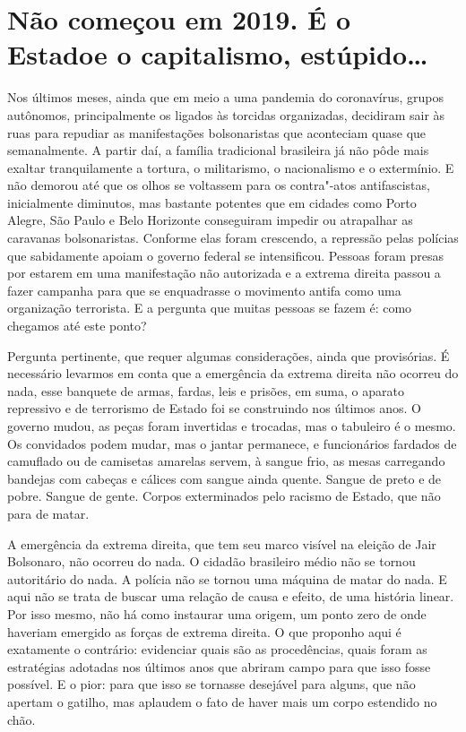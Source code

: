 \section{Não começou em 2019. É o Estado\break e o capitalismo, estúpido\ldots{}}

Nos últimos meses, ainda que em meio a uma pandemia do coronavírus,
grupos autônomos, principalmente os ligados às torcidas organizadas,
decidiram sair às ruas para repudiar as manifestações bolsonaristas que
aconteciam quase que semanalmente. A partir daí, a família tradicional
brasileira já não pôde mais exaltar tranquilamente a tortura, o
militarismo, o nacionalismo e o extermínio. E não demorou até que os
olhos se voltassem para os contra"-atos antifascistas, inicialmente
diminutos, mas bastante potentes que em cidades como Porto Alegre, São
Paulo e Belo Horizonte conseguiram impedir ou atrapalhar as caravanas
bolsonaristas. Conforme elas foram crescendo, a repressão pelas polícias
que sabidamente apoiam o governo federal se intensificou. Pessoas foram
presas por estarem em uma manifestação não autorizada e a
extrema direita passou a fazer campanha para que se enquadrasse o
movimento antifa como uma organização terrorista. E a pergunta
que muitas pessoas se fazem é: como chegamos até este ponto?

Pergunta pertinente, que requer algumas considerações, ainda que
provisórias. É necessário levarmos em conta que a emergência da
extrema direita não ocorreu do nada, esse banquete de armas, fardas,
leis e prisões, em suma, o aparato repressivo e de terrorismo de Estado
foi se construindo nos últimos anos. O governo mudou, as peças foram
invertidas e trocadas, mas o tabuleiro é o mesmo. Os convidados podem
mudar, mas o jantar permanece, e funcionários fardados de camuflado ou
de camisetas amarelas servem, à sangue frio, as mesas carregando
bandejas com cabeças e cálices com sangue ainda quente. Sangue de preto
e de pobre. Sangue de gente. Corpos exterminados pelo racismo de Estado,
que não para de matar.

A emergência da extrema direita, que tem seu marco visível na eleição de
Jair Bolsonaro, não ocorreu do nada. O cidadão brasileiro médio não se
tornou autoritário do nada. A polícia não se tornou uma máquina de matar
do nada. E aqui não se trata de buscar uma relação de causa e efeito, de
uma história linear. Por isso mesmo, não há como instaurar uma origem,
um ponto zero de onde haveriam emergido as forças de extrema direita. O
que proponho aqui é exatamente o contrário: evidenciar quais são as
procedências, quais foram as estratégias adotadas nos últimos anos que
abriram campo para que isso fosse possível. E o pior: para que isso se
tornasse desejável para alguns, que não apertam o gatilho, mas aplaudem
o fato de haver mais um corpo estendido no chão.


